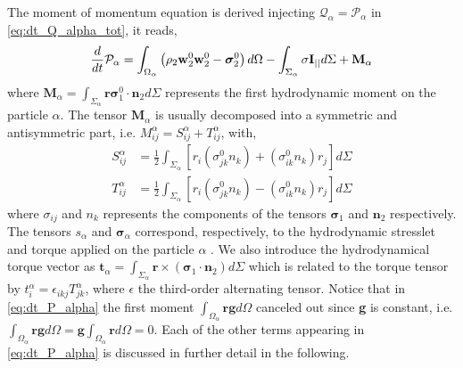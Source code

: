 The moment of momentum equation is derived injecting $\mathcal{Q}_\alpha = \mathcal{P}_\alpha$ in \ref{eq:dt_Q_alpha_tot}, it reads, 
\begin{equation}
    \frac{d}{d t} \mathcal{P}_\alpha
    = \int_{\Omega_\alpha} \left(
        \rho_2  \textbf{w}_2^0 \textbf{w}_2^0 
        - \bm{\sigma}_2^0
    \right) d\Omega
    - \int_{\Sigma_\alpha} 
        \sigma \textbf{I}_{||}
    d\Sigma
    + \textbf{M}_\alpha
    \label{eq:dt_P_alpha}
\end{equation}
where $\textbf{M}_\alpha = \int_{\Sigma_\alpha} \textbf{r}\bm{\sigma}_1^0\cdot \textbf{n}_2d\Sigma $ represents the first hydrodynamic moment on the particle $\alpha$.
The tensor $\textbf{M}_\alpha$ is usually decomposed into a symmetric and antisymmetric part, i.e. $M^\alpha_{ij} 
= S^\alpha_{ij}+T^\alpha_{ij}$, with,
\begin{align}
    \label{eq:M_decomposition}
    S^\alpha_{ij} 
    &= \frac{1}{2}  \int_{\Sigma_\alpha} \left[
        r_i(\sigma_{jk}^0 n_k)
        + (\sigma_{ik}^0 n_k)r_j
        \right]d\Sigma
    \\
    T^\alpha_{ij}
    &= \frac{1}{2}  \int_{\Sigma_\alpha} \left[
        r_i(\sigma_{jk}^0 n_k)
        - (\sigma_{ik}^0 n_k)r_j
    \right]d\Sigma \nonumber
\end{align}
where $\sigma_{ij}$ and $n_k$ represents the components of the tensors $\bm{\sigma}_1$ and $\textbf{n}_2$ respectively. 
The tensors $s_\alpha$ and $\bm{\sigma}_\alpha$ correspond, respectively, to the hydrodynamic stresslet and torque applied on the particle $\alpha$ \citep{guazzelli2011,kim2013microhydrodynamics}. 
We also introduce the hydrodynamical torque vector as $\textbf{t}_\alpha = \int_{\Sigma_\alpha} \textbf{r} \times (\bm{\sigma}_1\cdot \textbf{n}_2) d\Sigma$ which is related to the torque tensor by $t^\alpha_i = \epsilon_{ikj} T^\alpha_{jk}$, where $\epsilon$ the third-order alternating tensor. 
Notice that in \ref{eq:dt_P_alpha} the first moment  $\int_{\Omega_\alpha} \textbf{rg} d\Omega$ canceled out since \textbf{g} is constant, i.e. $\int_{\Omega_\alpha} \textbf{rg} d\Omega =\textbf{g}\int_{\Omega_\alpha} \textbf{r} d\Omega=0$. 
Each of the other terms appearing in \ref{eq:dt_P_alpha} is discussed in further detail in the following.

